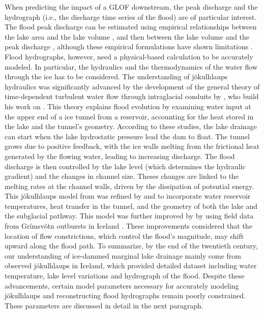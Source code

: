 When predicting the impact of a GLOF downstream, the peak discharge and the hydrograph (i.e., the discharge time series of the flood) are of particular interest. The flood peak discharge can be estimated using empirical relationships between the lake area and the lake volume \citep{Evans1986, Huggel&al2002, Cook&Quincey2015}, and then between the lake volume and the peak discharge \citep{Clague&Mathews1973, Haeberli1983, Costa1985, Evans1986, Walder&OConnor1997, Huggel&al2002}, although these empirical formulations have shown limitations \citep[e.g.][]{Huss&al2007}. Flood hydrographs, however, need a physical-based calculation to be accurately modeled. In particular, the hydraulics and the thermodynamics of the water flow through the ice has to be considered. The understanding of jökulhlaups hydraulics was significantly advanced by the development of the general theory of time-dependent turbulent water flow through intraglacial conduits by \cite{Nye1976}, who build his work on \cite{Roethlisberger1972,Shreve1972,Weertman1972}. This theory explains flood evolution by examining water input at the upper end of a ice tunnel from a reservoir, accounting for the heat stored in the lake and the tunnel's geometry. According to these studies, the lake drainage can start when the lake hydrostatic pressure lead the dam to float. The tunnel grows due to positive feedback, with the ice walls melting from the frictional heat generated by the flowing water, leading to increasing discharge. The flood discharge is then controlled by the lake level (which determines the hydraulic gradient) and the changes in channel size. Theses changes are linked to the melting rates at the channel walls, driven by the dissipation of potential energy. This jökulhlaups model from \cite{Nye1976} was refined by \cite{Spring&Hutter1981} and \cite{Clarke1982} to incorporate water reservoir temperatures, heat transfer in the tunnel, and the geometry of both the lake and the subglacial pathway. This model was further improved by \cite{Clarke2003} by using field data from Grímsvötn outbursts in Iceland \citep[see][]{Bjornsson2010}. These improvements considered that the location of flow constrictions, which control the flood's magnitude, may shift upward along the flood path. To summarize, by the end of the twentieth century, our understanding of ice-dammed marginal lake drainage mainly come from observed jökulhlaups in Iceland, which provided detailed dataset including water temperature, lake level variations and hydrograph of the flood. Despite these advancements, certain model parameters necessary for accurately modeling jökulhlaups and reconstructing flood hydrographs remain poorly constrained. These parameters are discussed in detail in the next paragraph. 

